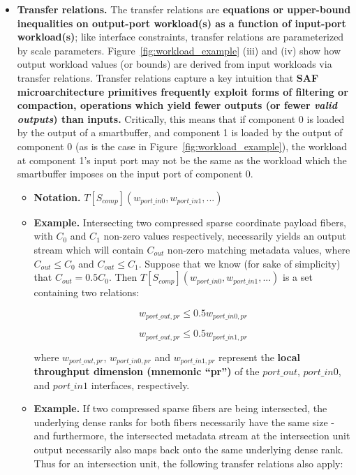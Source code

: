 \begin{itemize}
\begin{itemize}
\begin{itemize}
        \item \textbf{Transfer relations.} The transfer relations are \textbf{equations or upper-bound inequalities on output-port workload(s) as a function of input-port workload(s)}; like interface constraints, transfer relations are parameterized by scale parameters. Figure~\ref{fig:workload_example} (iii) and (iv) show how output workload values (or bounds) are derived from input workloads via transfer relations. Transfer relations capture a key intuition that \textbf{SAF microarchitecture primitives frequently exploit forms of filtering or compaction, operations which yield fewer outputs (or fewer \textit{valid outputs}) than inputs.} Critically, this means that if component 0 is loaded by the output of a smartbuffer, and component 1 is loaded by the output of component 0 (as is the case in Figure~\ref{fig:workload_example}), the workload at component 1's input port may not be the same as the workload which the smartbuffer imposes on the input port of component 0.
        \begin{itemize}
            \item \textbf{Notation.} $T[S_{comp}](w_{port\_in0},w_{port\_in1},...)$
            \item \textbf{Example.} Intersecting two compressed sparse coordinate payload fibers, with $C_0$ and $C_1$ non-zero values respectively, necessarily yields an output stream which will contain $C_{out}$ non-zero matching metadata values, where $C_{out} \leq C_0$ and $C_{out} \leq C_1$. Suppose that we know (for sake of simplicity) that $C_{out} = 0.5 C_0$. Then $T[S_{comp}](w_{port\_in0},w_{port\_in1},...)$ is a set containing two relations:

            \[w_{port\_out,pr} \leq 0.5 w_{port\_in0,pr}\]

            \[w_{port\_out,pr} \leq 0.5 w_{port\_in1,pr}\]

            where $w_{port\_out,pr}$, $w_{port\_in0,pr}$ and $w_{port\_in1,pr}$ represent the \textbf{local throughput dimension (mnemonic ``pr'')} of the $port\_out$, $port\_in0$, and $port\_in1$ interfaces, respectively.
            
            \item \textbf{Example.} If two compressed sparse fibers are being intersected, the underlying dense ranks for both fibers necessarily have the same size - and furthermore, the intersected metadata stream at the intersection unit output necessarily also maps back onto the same underlying dense rank. Thus for an intersection unit, the following transfer relations also apply:


\end{itemize}
\end{itemize}
\end{itemize}
\end{itemize}
